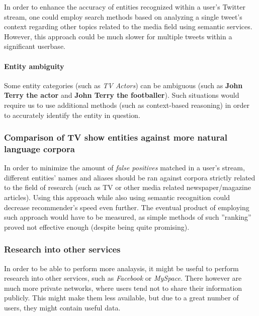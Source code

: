 In order to enhance the accuracy of entities recognized within a user's Twitter
stream, one could employ search methods based on analyzing a single tweet's
context regarding other topics related to the media field using semantic
services.  However, this approach could be much slower for multiple tweets
within a significant userbase.

\paragraph{Entity ambiguity}

Some entity categories (such as \textit{TV Actors}) can be ambiguous (such as \textbf{John Terry the actor} and \textbf{John Terry the footballer}). Such situations
would require us to use additional methods (such as context-based reasoning) in order to accurately identify the entity in question.

\subsubsection{Comparison of TV show entities against more natural language corpora}

In order to minimize the amount of \textit{false positives} matched in a user's
stream, different entities' names and aliases should be ran against corpora
strictly related to the field of research (such as TV or other media related
newspaper/magazine articles). Using this approach while also using semantic
recognition could decrease recommender's speed even further. The eventual
product of employing such approach would have to be measured, as simple methods
of such ''ranking'' proved not effective enough (despite being quite
promising).

\subsubsection{Research into other services}

In order to be able to perform more analaysis, it might be useful to perform
research into other services, such as \textit{Facebook} or \textit{MySpace}.
There however are much more private networks, where users tend not to share
their information publicly. This might make them less available, but due to a
great number of users, they might contain useful data.
